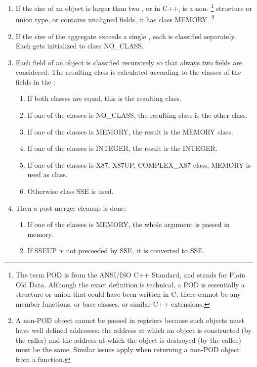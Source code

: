\begin{enumerate}
\item If the size of an object is larger than two \eightbytes, or
    in C++, is a non-%
\footnote{The term POD is from the ANSI/ISO C++ Standard, and
    stands for Plain Old Data.  Although the exact definition is
    technical, a POD is essentially a structure or union that could
    have been written in C; there cannot be any member
    functions, or base classes, or similar C++ extensions.}
  structure or union type, or contains unaligned fields, it has class
  MEMORY.%
   \footnote{A non-POD object cannot be passed in registers
    because such objects must have well defined addresses; the address
    at which an object is constructed (by the caller) and the address
    at which the object is destroyed (by the callee) must be the same.
    Similar issues apply when returning a non-POD object from a
    function.}

\item If the size of the aggregate exceeds a single \eightbyte, each is
    classified separately.  Each \eightbyte gets initialized to class NO_CLASS.

\item Each field of an object is classified recursively so that always
   two fields are considered.  The resulting class is calculated
   according to the classes of the fields in the \eightbyte:
   \begin{enumerate}
   \item
      If both classes are equal, this is the resulting class.
   \item If one of the classes is NO_CLASS, the resulting class is the other class.
   \item If one of the classes is MEMORY, the result is the MEMORY class.
   \item If one of the classes is INTEGER, the result is the INTEGER.
   \item If one of the classes is X87, X87UP, COMPLEX\_X87 class,
     MEMORY is used as class.
   \item Otherwise class SSE is used.
   \end{enumerate}
\item Then a post merger cleanup is done:
  \begin{enumerate}
  \item If one of the classes is MEMORY, the whole argument is passed in memory.
  \item If SSEUP is not preceeded by SSE, it is converted to SSE.
  \end{enumerate}
\end{enumerate}

